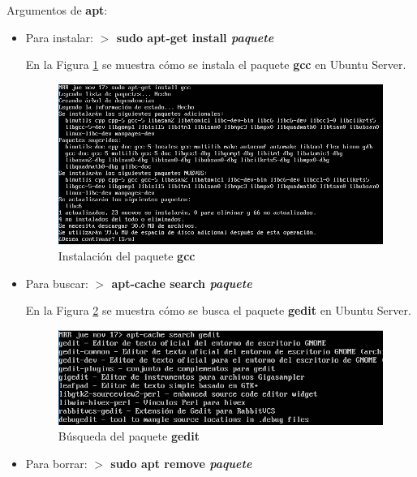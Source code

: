 Argumentos de \textbf{apt}\cite{enlace6}:
\begin{itemize}
	\item Para instalar: \textbf{$ > $ sudo apt-get install \textit{paquete}}\cite{enlace6}
	
	En la Figura \ref{fig:figura5} se muestra cómo se instala el paquete \textbf{gcc} en Ubuntu Server.
	\begin{figure}[H] %
		\centering
		\includegraphics[scale=0.6]{figuras/figura5.png} 
		\caption{Instalación del paquete \textbf{gcc}} 
		\label{fig:figura5}
	\end{figure}
	
	\item Para buscar: \textbf{$ > $ apt-cache search \textit{paquete}}\cite{enlace6}
	
	En la Figura \ref{fig:figura6} se muestra cómo se busca el paquete \textbf{gedit} en Ubuntu Server.
	\begin{figure}[H] %
		\centering
		\includegraphics[scale=0.8]{figuras/figura6.png} 
		\caption{Búsqueda del paquete \textbf{gedit}} 
		\label{fig:figura6}
	\end{figure}

\newpage

	\item Para borrar: \textbf{$ > $ sudo apt remove \textit{paquete}}\cite{enlace6}
	

\end{itemize}
